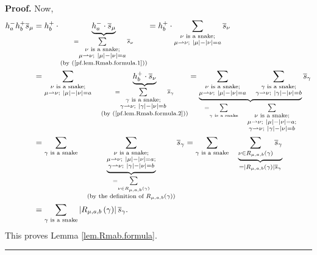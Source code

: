 \documentclass[numbers=enddot,12pt,final,onecolumn,notitlepage]{scrartcl}%
\theoremstyle{definition}
\newenvironment{proof}[1][Proof]{\noindent\textbf{#1.} }{\ \rule{0.5em}{0.5em}}
\let\sumnonlimits\sum
\renewcommand{\sum}{\sumnonlimits\limits}
\begin{document}
\begin{proof}
Now,%
\begin{align*}
h_{a}^{-}h_{b}^{+}\overline{s}_{\mu}  &  =h_{b}^{+}\cdot\underbrace{h_{a}%
^{-}\cdot\overline{s}_{\mu}}_{\substack{=\sum_{\substack{\nu\text{ is a
snake;}\\\mu\rightharpoonup\nu;\ \left\vert \mu\right\vert -\left\vert
\nu\right\vert =a}}\overline{s}_{\nu}\\\text{(by (\ref{pf.lem.Rmab.formula.1}%
))}}}=h_{b}^{+}\cdot\sum_{\substack{\nu\text{ is a snake;}\\\mu\rightharpoonup
\nu;\ \left\vert \mu\right\vert -\left\vert \nu\right\vert =a}}\overline
{s}_{\nu}\\
&  =\sum_{\substack{\nu\text{ is a snake;}\\\mu\rightharpoonup\nu;\ \left\vert
\mu\right\vert -\left\vert \nu\right\vert =a}}\ \ \ \underbrace{h_{b}^{+}%
\cdot\overline{s}_{\nu}}_{\substack{=\sum_{\substack{\gamma\text{ is a
snake;}\\\gamma\rightharpoonup\nu;\ \left\vert \gamma\right\vert -\left\vert
\nu\right\vert =b}}\overline{s}_{\gamma}\\\text{(by
(\ref{pf.lem.Rmab.formula.2}))}}}=\underbrace{\sum_{\substack{\nu\text{ is a
snake;}\\\mu\rightharpoonup\nu;\ \left\vert \mu\right\vert -\left\vert
\nu\right\vert =a}}\ \ \ \sum_{\substack{\gamma\text{ is a snake;}%
\\\gamma\rightharpoonup\nu;\ \left\vert \gamma\right\vert -\left\vert
\nu\right\vert =b}}}_{=\sum_{\gamma\text{ is a snake}}\ \ \ \sum
_{\substack{\nu\text{ is a snake;}\\\mu\rightharpoonup\nu;\ \left\vert
\mu\right\vert -\left\vert \nu\right\vert =a;\\\gamma\rightharpoonup
\nu;\ \left\vert \gamma\right\vert -\left\vert \nu\right\vert =b}}}%
\overline{s}_{\gamma}\\
&  =\sum_{\gamma\text{ is a snake}}\ \ \ \underbrace{\sum_{\substack{\nu\text{
is a snake;}\\\mu\rightharpoonup\nu;\ \left\vert \mu\right\vert -\left\vert
\nu\right\vert =a;\\\gamma\rightharpoonup\nu;\ \left\vert \gamma\right\vert
-\left\vert \nu\right\vert =b}}}_{\substack{=\sum_{\nu\in R_{\mu,a,b}\left(
\gamma\right)  }\\\text{(by the definition of }R_{\mu,a,b}\left(
\gamma\right)  \text{)}}}\overline{s}_{\gamma}=\sum_{\gamma\text{ is a snake}%
}\ \ \ \underbrace{\sum_{\nu\in R_{\mu,a,b}\left(  \gamma\right)  }%
\overline{s}_{\gamma}}_{=\left\vert R_{\mu,a,b}\left(  \gamma\right)
\right\vert \overline{s}_{\gamma}}\\
&  =\sum_{\gamma\text{ is a snake}}\left\vert R_{\mu,a,b}\left(
\gamma\right)  \right\vert \overline{s}_{\gamma}.
\end{align*}
This proves Lemma \ref{lem.Rmab.formula}.
\end{proof}
\end{document}
